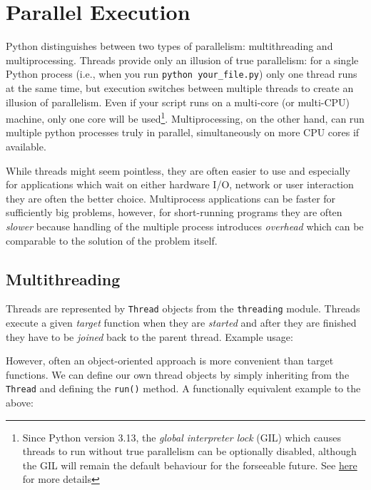 \documentclass{article}
\newcommand{\ls}[1]{\lstinline{#1}}
\begin{document}
\section{Parallel Execution}
Python distinguishes between two types of parallelism: multithreading and multiprocessing. Threads provide only an illusion of true parallelism: for a single Python process (i.e., when you run \ls{python your_file.py}) only one thread runs at the same time, but execution switches between multiple threads to create an illusion of parallelism. Even if your script runs on a multi-core (or multi-CPU) machine, only one core will be used\footnote{Since Python version 3.13, the \emph{global interpreter lock} (GIL) which causes  threads to run without true parallelism can be optionally disabled, although the GIL will remain the default behaviour for the forseeable future. See \href{https://docs.python.org/3.13/whatsnew/3.13.html\#whatsnew313-free-threaded-cpython}{here} for more details}. Multiprocessing, on the other hand, can run multiple python processes truly in parallel, simultaneously on more CPU cores if available.

While threads might seem pointless, they are often easier to use and especially for applications which wait on either hardware I/O, network or user interaction they are often the better choice. Multiprocess applications can be faster for sufficiently big problems, however, for short-running programs they are often \emph{slower} because handling of the multiple process introduces \emph{overhead} which can be comparable to the solution of the problem itself.

\subsection{Multithreading}

Threads are represented by \ls{Thread} objects from the \ls{threading} module. Threads execute a given \emph{target} function when they are \emph{started} and after they are finished they have to be \emph{joined} back to the parent thread. Example usage:


However, often an object-oriented approach is more convenient than target functions. We can define our own thread objects by simply inheriting from the \ls{Thread} and defining the \ls{run()} method. A functionally equivalent example to the above:

\end{document}
